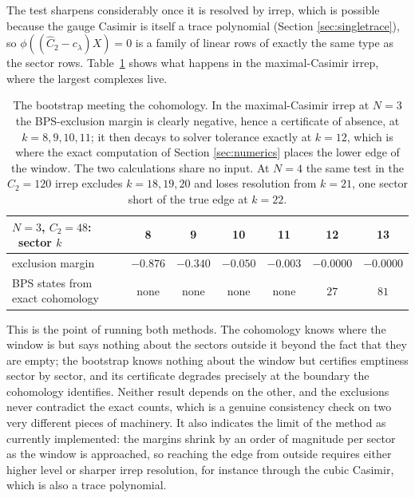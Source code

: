 \documentclass[10pt]{article}
\begin{document}
The test sharpens considerably once it is resolved by irrep, which is possible because the gauge Casimir is
itself a trace polynomial (Section \ref{sec:singletrace}), so $\phi((\hat C_2-c_\lambda)X)=0$ is a family of
linear rows of exactly the same type as the sector rows. Table~\ref{tab:exclusion} shows what happens in the
maximal-Casimir irrep, where the largest complexes live.

\begin{table}[t]\centering\small
\begin{tabular}{@{}lcccccc@{}}\toprule
$N=3$, $C_2=48$: \ sector $k$ & 8 & 9 & 10 & 11 & 12 & 13\\
\midrule
exclusion margin & $-0.876$ & $-0.340$ & $-0.050$ & $-0.003$ & $-0.0000$ & $-0.0000$\\
BPS states from exact cohomology & none & none & none & none & $27$ & $81$\\
\bottomrule
\end{tabular}
\caption{The bootstrap meeting the cohomology. In the maximal-Casimir irrep at $N=3$ the BPS-exclusion margin is
clearly negative, hence a certificate of absence, at $k=8,9,10,11$; it then decays to solver tolerance exactly at
$k=12$, which is where the exact computation of Section \ref{sec:numerics} places the lower edge of the window.
The two calculations share no input. At $N=4$ the same test in the $C_2=120$ irrep excludes $k=18,19,20$ and
loses resolution from $k=21$, one sector short of the true edge at $k=22$.}
\label{tab:exclusion}
\end{table}

This is the point of running both methods. The cohomology knows where the window is but says nothing about the
sectors outside it beyond the fact that they are empty; the bootstrap knows nothing about the window but
certifies emptiness sector by sector, and its certificate degrades precisely at the boundary the cohomology
identifies. Neither result depends on the other, and the exclusions never contradict the exact counts, which is
a genuine consistency check on two very different pieces of machinery. It also indicates the limit of the
method as currently implemented: the margins shrink by an order of magnitude per sector as the window is
approached, so reaching the edge from outside requires either higher level or sharper irrep resolution, for
instance through the cubic Casimir, which is also a trace polynomial.
\end{document}
